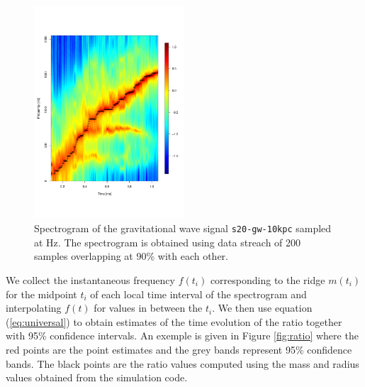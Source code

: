 \begin{figure}
 \centering
 \includegraphics[width=0.5\textwidth]{plots/spectrogram}
 \caption{Spectrogram of the gravitational wave signal {\tt s20-gw-10kpc} sampled at \unit[4096]{Hz}.
   The spectrogram is obtained using data streach of 200 samples overlapping at 90\%
   with each other.} \label{fig:spectrogram}
\end{figure}


We collect the instantaneous frequency $f(t_i)$ corresponding to the ridge $m(t_i)$ for
the midpoint $t_i$ of each local time interval of the spectrogram and interpolating $f(t)$
for values in between the $t_i$. We then use equation (\ref{eq:universal}) to obtain
estimates of the time evolution of the ratio together with 95\% confidence intervals.
An exemple is given in Figure \ref{fig:ratio} where the red points are the point estimates and
the grey bands represent 95\% confidence bands. The black points are the ratio values
computed using the mass and radius values obtained from the simulation code. 


